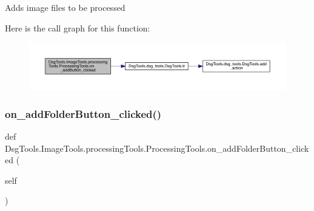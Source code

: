 \begin{DoxyVerb}Adds image files to be processed
\end{DoxyVerb}
 Here is the call graph for this function\+:
\nopagebreak
\begin{figure}[H]
\begin{center}
\leavevmode
\includegraphics[width=350pt]{class_dsg_tools_1_1_image_tools_1_1processing_tools_1_1_processing_tools_a375edc578937df2680546fcc63a15c9d_cgraph}
\end{center}
\end{figure}
\mbox{\label{class_dsg_tools_1_1_image_tools_1_1processing_tools_1_1_processing_tools_a88953ffad9619128d85cd444564b0b7c}} 
\subsubsection{\texorpdfstring{on\+\_\+add\+Folder\+Button\+\_\+clicked()}{on\_addFolderButton\_clicked()}}
{\footnotesize\ttfamily def Dsg\+Tools.\+Image\+Tools.\+processing\+Tools.\+Processing\+Tools.\+on\+\_\+add\+Folder\+Button\+\_\+clicked (\begin{DoxyParamCaption}\item[{}]{self }\end{DoxyParamCaption})}

